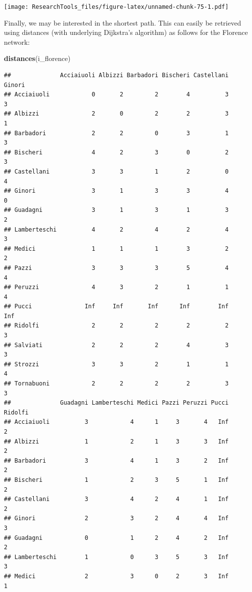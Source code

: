 \documentclass[]{article}
\newenvironment{Shaded}{\begin{snugshade}}{\end{snugshade}}
\newcommand{\KeywordTok}[1]{\textcolor[rgb]{0.13,0.29,0.53}{\textbf{#1}}}
\newcommand{\NormalTok}[1]{#1}
\theoremstyle{definition}
\theoremstyle{definition}
\theoremstyle{definition}
\theoremstyle{remark}
\begin{document}
\texttt{[image: ResearchTools\_files/figure-latex/unnamed-chunk-75-1.pdf]}

Finally, we may be interested in the shortest path. This can easily be
retrieved using distances (with underlying Dijkstra's algorithm) as
follows for the Florence network:

\begin{Shaded}
\begin{Highlighting}[]
\KeywordTok{distances}\NormalTok{(i_florence)}
\end{Highlighting}
\end{Shaded}

\begin{verbatim}
##              Acciaiuoli Albizzi Barbadori Bischeri Castellani Ginori
## Acciaiuoli            0       2         2        4          3      3
## Albizzi               2       0         2        2          3      1
## Barbadori             2       2         0        3          1      3
## Bischeri              4       2         3        0          2      3
## Castellani            3       3         1        2          0      4
## Ginori                3       1         3        3          4      0
## Guadagni              3       1         3        1          3      2
## Lamberteschi          4       2         4        2          4      3
## Medici                1       1         1        3          2      2
## Pazzi                 3       3         3        5          4      4
## Peruzzi               4       3         2        1          1      4
## Pucci               Inf     Inf       Inf      Inf        Inf    Inf
## Ridolfi               2       2         2        2          2      3
## Salviati              2       2         2        4          3      3
## Strozzi               3       3         2        1          1      4
## Tornabuoni            2       2         2        2          3      3
##              Guadagni Lamberteschi Medici Pazzi Peruzzi Pucci Ridolfi
## Acciaiuoli          3            4      1     3       4   Inf       2
## Albizzi             1            2      1     3       3   Inf       2
## Barbadori           3            4      1     3       2   Inf       2
## Bischeri            1            2      3     5       1   Inf       2
## Castellani          3            4      2     4       1   Inf       2
## Ginori              2            3      2     4       4   Inf       3
## Guadagni            0            1      2     4       2   Inf       2
## Lamberteschi        1            0      3     5       3   Inf       3
## Medici              2            3      0     2       3   Inf       1

\end{verbatim}
\end{document}
